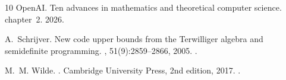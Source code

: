 \documentclass[11pt]{amsart}
\theoremstyle{plain}
\theoremstyle{remark}
\begin{document}
\begin{thebibliography}{10}
{OpenAI}.
\newblock Ten advances in mathematics and theoretical computer science.
\newblock chapter~2. 2026.

A.~Schrijver.
\newblock New code upper bounds from the {T}erwilliger algebra and semidefinite
  programming.
, 51(9):2859--2866,
  2005.
\newblock \href {https://doi.org/10.1109/TIT.2005.851748}
  {}.

M.~M. Wilde.
.
\newblock Cambridge University Press, 2nd edition, 2017.
\newblock \href {https://doi.org/10.1017/9781316809976}
  {}.

\end{thebibliography}
\end{document}
